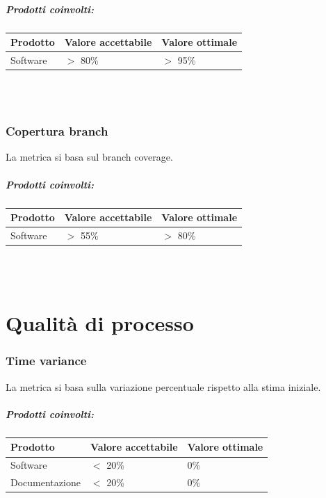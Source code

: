 \documentclass[a4paper, 12pt]{article}
\begin{document}
\subparagraph{Prodotti coinvolti:}
\begin{center}
	\begin{tabularx}{\textwidth}{|X|X|X|}
		\hline
		\textbf{Prodotto} & \textbf{Valore accettabile } & \textbf{Valore ottimale } \\
		\hline
		Software          & $>$ 80\%                     & $>$ 95\%                     \\
		\hline
	\end{tabularx}\\[8pt]
	\mbox{}\\
\end{center}
\subsubsection{Copertura branch}
La metrica si basa sul branch coverage.

\subparagraph{Prodotti coinvolti:}
\begin{center}
	\begin{tabularx}{\textwidth}{|X|X|X|}
		\hline
		\textbf{Prodotto} & \textbf{Valore accettabile } & \textbf{Valore ottimale } \\
		\hline
		Software          & $>$ 55\%                     & $>$ 80\%                     \\
		\hline
	\end{tabularx}\\[8pt]
	\mbox{}\\
\end{center}

\newpage
\section{Qualità di processo}
\subsubsection{Time variance}
La metrica si basa sulla variazione percentuale rispetto alla stima iniziale.

\subparagraph{Prodotti coinvolti:}
\begin{center}
	\begin{tabularx}{\textwidth}{|X|X|X|}
		\hline
		\textbf{Prodotto} & \textbf{Valore accettabile } & \textbf{Valore ottimale } \\
		\hline
		Software          & $<$ 20\%                     & 0\%                       \\
		\hline
		Documentazione    & $<$ 20\%                     & 0\%                       \\
		\hline
	\end{tabularx}\\[8pt]
	\mbox{}\\
\end{center}
\end{document}
